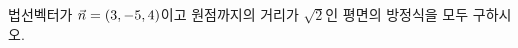법선벡터가 $\vec{n}=(3{,}\mkern3mu\mathopen{}-5{,}\mkern3mu\mathopen{}4)$이고 원점까지의 거리가 $\sqrt{2}$인 평면의 방정식을 모두 구하시오.
